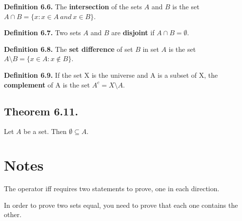 \documentclass{article}
\begin{document}
\textbf{Definition 6.6.} The \textbf{intersection} of the sets $A$ and $B$ is the set 
	$A \cap B = \{x : x \in A\ and\ x \in B \}$.
	
\textbf{Definition 6.7.} Two sets $A$ and $B$ are \textbf{disjoint} if $A \cap B = \emptyset$.

\textbf{Definition 6.8.} The \textbf{set difference} of set $B$ in set $A$ is the set 
	$A \setminus B = \{x \in A : x \notin B \}$.
	
\textbf{Definition 6.9.} If the set X is the universe and A is a subset of X, the  \textbf{complement} of A is the set $A^c = X \setminus A$.

\subsection{Theorem 6.11.} Let $A$ be a set. Then $\emptyset \subseteq A$. 


\pagebreak
\section{Notes}
The operator iff requires two statements to prove, one in each direction.

In order to prove two sets equal, you need to prove that each one contains the other.
\end{document}
